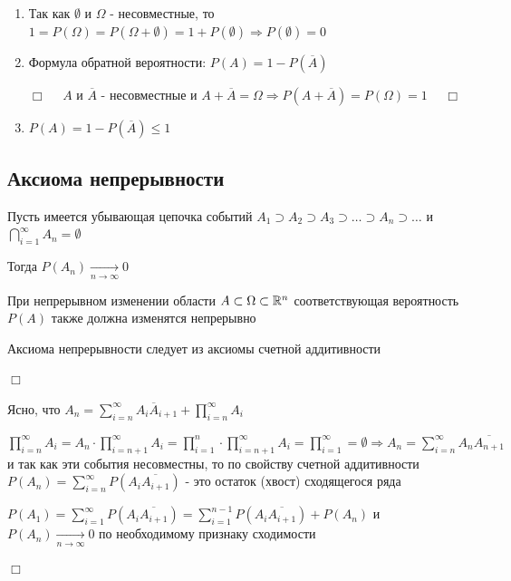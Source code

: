 \documentclass[12pt]{article}
\begin{document}
    \begin{enumerate}

        \item Так как $\emptyset$ и $\Omega$ - несовместные, то $1 = P(\Omega) = P(\Omega + \emptyset) = 1 + P(\emptyset) \Longrightarrow P(\emptyset) = 0$

        \item Формула обратной вероятности: $P(A) = 1 - P(\overline{A})$

        \begin{tcolorbox}
            $\Box \quad$ $A$ и $\overline{A}$ - несовместные и $A + \overline{A} = \Omega \Longrightarrow P(A + \overline{A}) = P(\Omega) = 1$ $\quad \Box$
        \end{tcolorbox}

        \item $P(A) = 1 - P(\overline{A}) \leq 1$

    \end{enumerate}

    \hypertarget{continuityaxiom}{}

    \subsection{Аксиома непрерывности}

    \begin{MyTheorem}
        \Ths Пусть имеется убывающая цепочка событий $A_1 \supset A_2 \supset A_3 \supset \dots \supset A_n \supset \dots$ и $\bigcap_{i = 1}^\infty A_n = \emptyset$

        Тогда $P(A_n) \underset{n \to \infty}{\to} 0$

        При непрерывном изменении области $A \subset \Omega \subset \mathbb{R}^n$ соответствующая вероятность $P(A)$ также должна изменятся непрерывно
    \end{MyTheorem}

    Аксиома непрерывности следует из аксиомы счетной аддитивности

    \begin{tcolorbox}
        $\Box$

        Ясно, что $A_n = \sum_{i = n}^\infty A_i \overline{A}_{i + 1} + \prod_{i = n}^\infty A_i$

        $\prod_{i = n}^\infty A_i = A_n \cdot \prod_{i = n + 1}^\infty A_i = \prod_{i = 1}^n
        \cdot \prod_{i = n + 1}^\infty A_i = \prod_{i = 1}^\infty = \emptyset \Longrightarrow
        A_n = \sum_{i = n}^\infty A_n \overline{A_{n + 1}}$ и так как эти события несовместны,
        то по свойству счетной аддитивности $P(A_n) = \sum_{i = n}^\infty P(A_i \overline{A_{i + 1}})$ - это остаток (хвост) сходящегося ряда

        $P(A_1) = \sum_{i = 1}^\infty P(A_i \overline{A_{i + 1}}) = \sum_{i = 1}^{n - 1} P(A_i \overline{A_{i + 1}}) + P(A_n)$ и $P(A_n) \underset{n \to \infty}{\to} 0$ по необходимому признаку сходимости

        $\Box$
    \end{tcolorbox}
\end{document}
